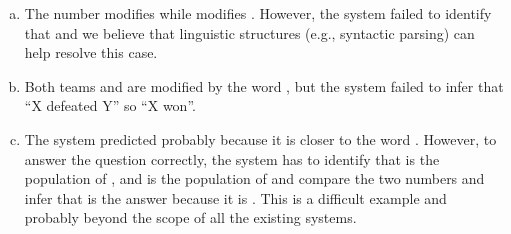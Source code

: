 \begin{enumerate}[(a)]
  \item The number  modifies  while  modifies . However, the system failed to identify that and we believe that linguistic structures (e.g., syntactic parsing) can help resolve this case.
  \item Both teams  and  are modified by the word , but the system failed to infer that ``X defeated Y'' so ``X won''.
  \item The system predicted  probably because it is closer to the word . However, to answer the question correctly, the system has to identify that  is the population of , and  is the population of  and compare the two numbers and infer that  is the answer because it is . This is a difficult example and probably beyond the scope of all the existing systems.
\end{enumerate}

